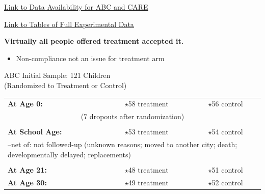 \documentclass[static]{JJH-Beamer}
\begin{document}
\hypertarget{ret:protein}{}
\begin{center}
\hyperlink{protein}{\underline{Link to Data Availability for ABC and CARE}}
\end{center}

\begin{frame}

\hypertarget{ret:potatochips}{}
\begin{center}
\hyperlink{potatochips}{\underline{Link to Tables of Full Experimental Data}}
\end{center}

\end{frame}

\begin{frame}

\begin{center}
\textbf{Virtually all people offered treatment accepted it.}
\end{center}

\begin{itemize}
\item Non-compliance not an issue for treatment arm
\end{itemize}

\end{frame}

\begin{frame}

\begin{center}
ABC Initial Sample: 121 Children \\(Randomized to Treatment or Control)
\end{center}

\begin{tabular}{lcc}
\toprule
\textbf{At Age 0:}  & $\star$58 treatment & $\star$56 control \\
\multicolumn{3}{c}{(7 dropouts after randomization)} \\ \\
\textbf{At School Age:}  & $\star$53 treatment & $\star$54 control \\
\multicolumn{3}{p{\textwidth}}{--net of: not followed-up (unknown reasons; moved to another city; death; developmentally delayed; replacements)} \\ \\
\textbf{At Age 21:}  & $\star$48 treatment & $\star$51 control \\
\textbf{At Age 30:}  & $\star$49 treatment & $\star$52 control \\
\bottomrule
\end{tabular}
\end{frame}
\end{document}
